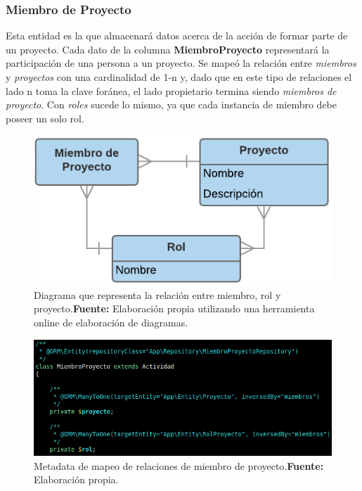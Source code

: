 \subsubsection{Miembro de Proyecto}%
\label{ssub:miembro_de_proyecto_modelo}
Esta entidad es la que almacenará datos acerca de la acción de formar parte de un proyecto. Cada dato de la columna \textbf{MiembroProyecto} representará la participación
de una persona a un proyecto\@.
Se mapeó la relación entre \textit{miembros} y \textit{proyectos} con una cardinalidad de 1-n y, dado que en este tipo de relaciones el lado n toma la clave foránea, el lado
propietario termina siendo \textit{miembros de proyecto}\@.
Con \textit{roles} sucede lo mismo, ya que cada instancia de miembro debe poseer un solo rol.

\begin{figure}[h]
    \includegraphics[width=1\linewidth]{image/mpr-new.png}
    \caption[Diagrama que representa la relación entre miembro, rol y proyecto]{Diagrama que representa la relación entre miembro, rol y proyecto.\newline \textbf{Fuente:} Elaboración propia utilizando una herramienta online de elaboración de diagramas.}
    \label{fig:image/mpr-new}
\end{figure}

\begin{figure}[h]
    \includegraphics[width=1\linewidth]{image/miembros.png}
    \caption[Metadata de mapeo de relaciones de miembro de proyecto]{Metadata de mapeo de relaciones de miembro de proyecto.\newline \textbf{Fuente:} Elaboración propia.}
    \label{fig:image/miembros}
\end{figure}

